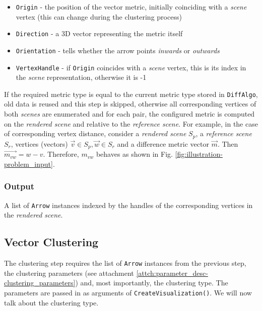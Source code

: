 \begin{itemize}
\item \verb+Origin+ - the position of the vector metric, initially coinciding with a {\it scene} vertex (this can change during the clustering process)
\item \verb+Direction+ - a 3D vector representing the metric itself
\item \verb+Orientation+ - tells whether the arrow points {\it inwards} or {\it outwards}
\item \verb+VertexHandle+ - if \verb+Origin+ coincides with a {\it scene} vertex, this is its index in the {\it scene} representation, otherwise it is -1
\end{itemize}

If the required metric type is equal to the current metric type stored in \verb+DiffAlgo+, old data is reused and this step is skipped, otherwise all corresponding vertices of both {\it scenes} are enumerated and for each pair, the configured metric is computed on the {\it rendered scene} and relative to the {\it reference scene}. For example, in the case of corresponding vertex distance, consider a {\it rendered scene} \(S_p\), a {\it reference scene} \(S_r\), vertices (vectors) \(\overrightarrow{v} \in S_p, \overrightarrow{w} \in S_r\) and a difference metric vector \(\overrightarrow{m}\). Then \(\overrightarrow{m_{vw}} = w - v\). Therefore, \(m_{vw}\) behaves as shown in Fig. \ref{fig:illustration-problem_input}.

\subsubsection{Output}

A list of \verb+Arrow+ instances indexed by the handles of the corresponding vertices in the {\it rendered scene}.

\subsection{Vector Clustering}
\label{subsec:implementation-algorithm-clustering}

The clustering step requires the list of \verb+Arrow+ instances from the previous step, the clustering parameters (see attachment \ref{attch:parameter_desc-clustering_parameters}) and, most importantly, the clustering type. The parameters are passed in as arguments of \verb+CreateVisualization()+. We will now talk about the clustering type.

